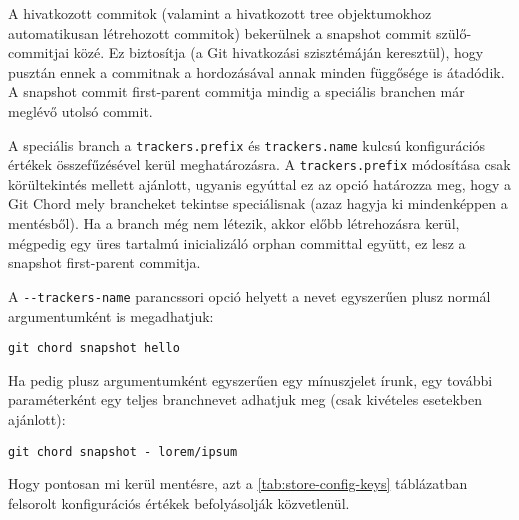 \documentclass[
]{elteikthesis}[2025/03/25]
\begin{document}
A hivatkozott commitok (valamint a hivatkozott tree objektumokhoz automatikusan létrehozott commitok)
bekerülnek a snapshot commit szülő-commitjai közé.
Ez biztosítja (a Git hivatkozási szisztémáján keresztül),
hogy pusztán ennek a commitnak a hordozásával annak minden függősége is átadódik.
A snapshot commit first-parent commitja mindig a speciális branchen már meglévő utolsó commit.

A speciális branch a \verb|trackers.prefix| és \verb|trackers.name| kulcsú konfigurációs értékek összefűzésével kerül meghatározásra.
A \verb|trackers.prefix| módosítása csak körültekintés mellett ajánlott,
ugyanis egyúttal ez az opció határozza meg,
hogy a Git Chord mely brancheket tekintse speciálisnak
(azaz hagyja ki mindenképpen a mentésből).
Ha a branch még nem létezik, akkor előbb létrehozásra kerül,
mégpedig egy üres tartalmú inicializáló orphan committal együtt,
ez lesz a snapshot first-parent commitja.

A \verb|--trackers-name| parancssori opció helyett a nevet egyszerűen plusz normál argumentumként is megadhatjuk:

\begin{verbatim}
git chord snapshot hello
\end{verbatim}

Ha pedig plusz argumentumként egyszerűen egy mínuszjelet írunk,
egy további paraméterként egy teljes branchnevet adhatjuk meg (csak kivételes esetekben ajánlott):

\begin{verbatim}
git chord snapshot - lorem/ipsum
\end{verbatim}

Hogy pontosan mi kerül mentésre, azt a \ref{tab:store-config-keys} táblázatban felsorolt
konfigurációs értékek befolyásolják közvetlenül.
\end{document}
